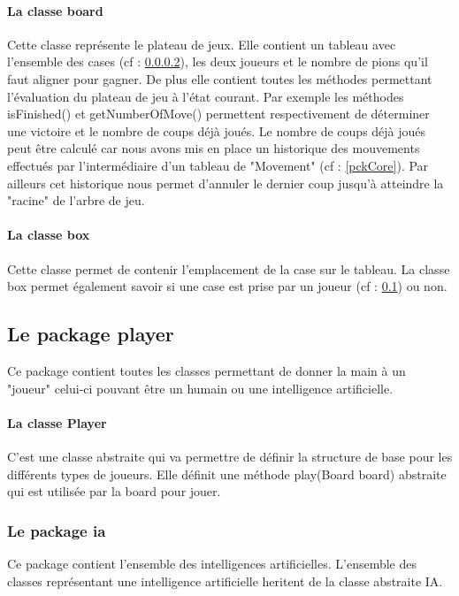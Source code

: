 \documentclass{report}
\begin{document}
                		\paragraph{La classe board}\label{classeBoard}
               			 Cette classe représente le plateau de jeux. Elle contient un tableau avec l'ensemble des cases (cf : \ref{classBox}), les deux joueurs et le nombre de pions qu'il faut aligner pour gagner.
               			 De plus elle contient toutes les méthodes permettant l'évaluation du plateau de jeu à l'état courant. Par exemple les méthodes isFinished() et getNumberOfMove() permettent respectivement de
               			 déterminer une victoire et le nombre de coups déjà joués. Le nombre de coups déjà joués peut être calculé car nous avons mis en place un historique des mouvements effectués
               			 par l'intermédiaire d'un tableau de "Movement" (cf : \ref{pckCore}).
               			 Par ailleurs cet historique nous permet d'annuler le dernier coup jusqu'à atteindre la "racine" de l'arbre de jeu.

                    \paragraph{La classe box} \label{classBox}

               Cette classe permet de contenir l'emplacement de la case sur le tableau.
               La classe box permet également savoir si une case est prise par un joueur (cf : \ref{pckPlayer}) ou non.

			\subsection{Le package player} \label{pckPlayer}
			Ce package contient toutes les classes permettant de donner la main à un "joueur" celui-ci pouvant être un humain ou une intelligence artificielle.

			\paragraph{La classe Player}
			C'est une classe abstraite qui va permettre de définir la structure de base pour les différents types de joueurs.
			  Elle définit une méthode play(Board board) abstraite qui est utilisée par la board pour jouer.
            \subsubsection{Le package ia}
              Ce package contient l'ensemble des intelligences artificielles. L'ensemble des classes représentant une intelligence artificielle heritent de la classe abstraite IA.
\end{document}
